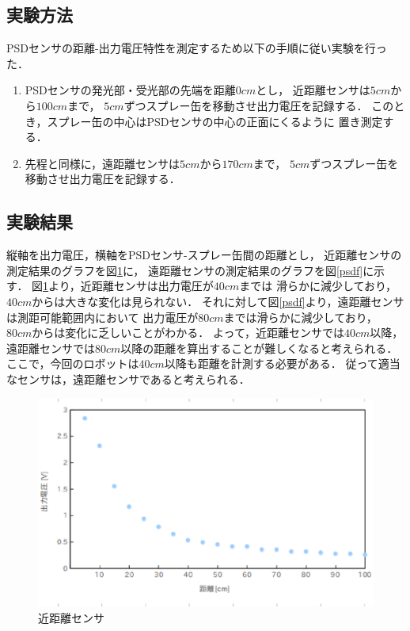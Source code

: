 \documentclass[10pt,a4j]{jarticle}
\begin{document}
\subsection{実験方法}
PSDセンサの距離-出力電圧特性を測定するため以下の手順に従い実験を行った．
\begin{enumerate}
 \item PSDセンサの発光部・受光部の先端を距離$0\unit{cm}$とし，
       近距離センサは$5\unit{cm}$から$100\unit{cm}$まで，
       $5\unit{cm}$ずつスプレー缶を移動させ出力電圧を記録する．
       このとき，スプレー缶の中心はPSDセンサの中心の正面にくるように
       置き測定する．
 \item 先程と同様に，遠距離センサは$5\unit{cm}$から$170\unit{cm}$まで，
       $5\unit{cm}$ずつスプレー缶を移動させ出力電圧を記録する．
\end{enumerate} 

\subsection{実験結果}
縦軸を出力電圧，横軸をPSDセンサ-スプレー缶間の距離とし，
近距離センサの測定結果のグラフを図\ref{psdn}に，
遠距離センサの測定結果のグラフを図\ref{psdf}に示す．
図\ref{psdn}より，近距離センサは出力電圧が$40\unit{cm}$までは
滑らかに減少しており，$40\unit{cm}$からは大きな変化は見られない．
それに対して図\ref{psdf}より，遠距離センサは測距可能範囲内において
出力電圧が$80\unit{cm}$までは滑らかに減少しており，
$80\unit{cm}$からは変化に乏しいことがわかる．
よって，近距離センサでは$40\unit{cm}$以降，遠距離センサでは$80\unit{cm}$以降の距離を算出することが難しくなると考えられる．
ここで，今回のロボットは$40\unit{cm}$以降も距離を計測する必要がある．
従って適当なセンサは，遠距離センサであると考えられる．


\newpage
\begin{figure}[htb]
  \begin{center}
    \includegraphics[width=1.0\hsize]{picture/psdn.eps}
    \caption{近距離センサ}
    \label{psdn}
  \end{center}
\end{figure}
\end{document}
